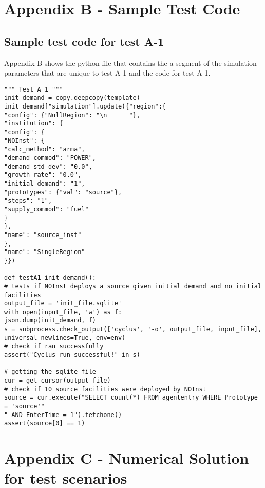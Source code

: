 \documentclass[11pt,letterpaper]{article}
\begin{document}
\section*{Appendix B - Sample Test Code }
\subsection*{Sample test code for test A-1}
Appendix B shows the python file that contains the a segment of the simulation parameters that are unique to test A-1 and the code for test A-1. 
\begin{verbatim}
""" Test A_1 """
init_demand = copy.deepcopy(template)
init_demand["simulation"].update({"region":{
"config": {"NullRegion": "\n      "}, 
"institution": {
"config": {
"NOInst": {
"calc_method": "arma", 
"demand_commod": "POWER", 
"demand_std_dev": "0.0", 
"growth_rate": "0.0", 
"initial_demand": "1", 
"prototypes": {"val": "source"}, 
"steps": "1", 
"supply_commod": "fuel"
}
}, 
"name": "source_inst"
}, 
"name": "SingleRegion"
}})

def testA1_init_demand():
# tests if NOInst deploys a source given initial demand and no initial facilities
output_file = 'init_file.sqlite'
with open(input_file, 'w') as f:
json.dump(init_demand, f)
s = subprocess.check_output(['cyclus', '-o', output_file, input_file],
universal_newlines=True, env=env)
# check if ran successfully
assert("Cyclus run successful!" in s)

# getting the sqlite file
cur = get_cursor(output_file)
# check if 10 source facilities were deployed by NOInst
source = cur.execute("SELECT count(*) FROM agententry WHERE Prototype = 'source'"
" AND EnterTime = 1").fetchone()
assert(source[0] == 1)
\end{verbatim}

\section*{Appendix C - Numerical Solution for test scenarios}
\end{document}
